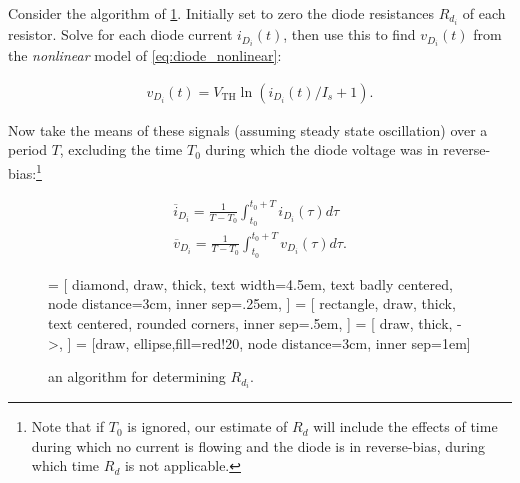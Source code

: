 \documentclass[electronics.tex]{subfiles}
\begin{document}
Consider the algorithm of \cref{fig:diode_resistance_algorithm}.
Initially set to zero the diode resistances $R_{d_i}$ of each resistor.
Solve for each diode current $i_{D_i}(t)$, then use this to find $v_{D_i}(t)$ from the
\emph{nonlinear} model of \cref{eq:diode_nonlinear}:

\begin{align}
  \label{eq:diode_nonlinear_for_v}
  v_{D_i}(t) = V_\text{TH}
    \ln(
      i_{D_i}(t)/I_s + 1
    ).
\end{align}

Now take the means of these signals (assuming steady state oscillation) over a period $T$, excluding the time $T_0$ during which the diode voltage was in reverse-bias:\footnote{Note that if $T_0$ is ignored, our estimate of $R_d$ will include the effects of time during which no current is flowing and the diode is in reverse-bias, during which time $R_d$ is not applicable.}

\begin{subequations}
\begin{align}
  \overline{i}_{D_i} = \frac{1}{T-T_0}
    \int_{t_0}^{t_0+T} i_{D_i}(\tau) d\tau \\
  \overline{v}_{D_i} = \frac{1}{T-T_0}
    \int_{t_0}^{t_0+T} v_{D_i}(\tau) d\tau. 
\end{align}
\end{subequations}

\begin{figure}
\centering
\usetikzlibrary{shapes,arrows}
 = [
  diamond, 
  draw, 
  thick,
  text width=4.5em, 
  text badly centered, 
  node distance=3cm, 
  inner sep=.25em, 
]
 = [
  rectangle, 
  draw, 
  thick,
  text centered, 
  rounded corners, 
  inner sep=.5em, 
]
 = [
  draw, 
  thick,
  ->,
]
 = [draw, ellipse,fill=red!20, node distance=3cm, inner sep=1em]
{\sffamily
{}
}
\caption{an algorithm for determining $R_{d_i}$.}
\label{fig:diode_resistance_algorithm}
\end{figure}
\end{document}
